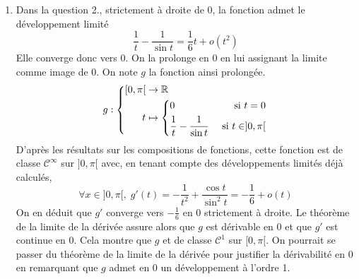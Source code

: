 \begin{enumerate}
  \item Dans la question 2., strictement à droite de $0$, la fonction admet le développement limité
\begin{displaymath}
\frac{1}{t} - \frac{1}{\sin t} = \frac{1}{6}t + o(t^2)
\end{displaymath}
Elle converge donc vers $0$. On la prolonge en $0$ en lui assignant la limite comme image de $0$. On note $g$ la fonction ainsi prolongée.
\begin{displaymath}
  g:
\left\lbrace 
\begin{aligned}
  \left[ 0,\pi \right[ &\rightarrow \mathbb{R} \\
  t       &\mapsto
      \left\lbrace 
        \begin{aligned}
          &0                              &\text{ si } t = 0\\
          &\frac{1}{t} - \frac{1}{\sin t} &\text{ si } t\in ]0,\pi[
        \end{aligned}
      \right. 
\end{aligned}
\right. 
\end{displaymath}
D'après les résultats sur les compositions de fonctions, cette fonction est de classe $\mathcal{C}^{\infty}$ sur $]0,\pi[$ avec, en tenant compte des développements limités déjà calculés,
\begin{displaymath}
\forall x \in]0,\pi[,\;
g'(t) = -\frac{1}{t^2} + \frac{\cos t}{\sin^2t} = -\frac{1}{6} + o(t)
\end{displaymath}
On en déduit que $g'$ converge vers $-\frac{1}{6}$ en $0$ strictement à droite. Le théorème de la limite de la dérivée assure alors que $g$ est dérivable en $0$ et que $g'$ est continue en $0$. Cela montre que $g$ et de classe $\mathcal{C}^1$ sur $[0,\pi[$.\newline
On pourrait se passer du théorème de la limite de la dérivée pour justifier la dérivabilité en $0$ en remarquant que $g$ admet en $0$ un développement à l'ordre 1.
\end{enumerate}

